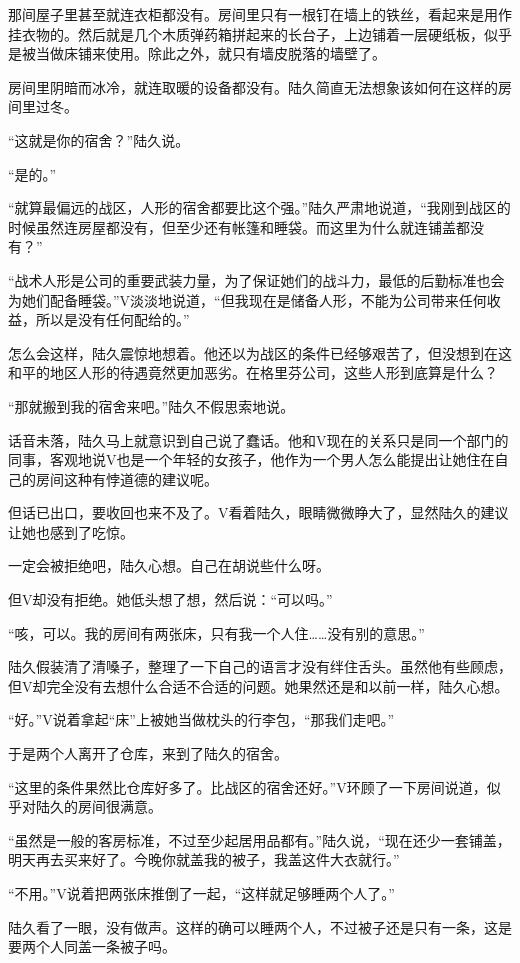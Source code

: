 那间屋子里甚至就连衣柜都没有。房间里只有一根钉在墙上的铁丝，看起来是用作挂衣物的。然后就是几个木质弹药箱拼起来的长台子，上边铺着一层硬纸板，似乎是被当做床铺来使用。除此之外，就只有墙皮脱落的墙壁了。

房间里阴暗而冰冷，就连取暖的设备都没有。陆久简直无法想象该如何在这样的房间里过冬。

“这就是你的宿舍？”陆久说。

“是的。”

“就算最偏远的战区，人形的宿舍都要比这个强。”陆久严肃地说道，“我刚到战区的时候虽然连房屋都没有，但至少还有帐篷和睡袋。而这里为什么就连铺盖都没有？”

“战术人形是公司的重要武装力量，为了保证她们的战斗力，最低的后勤标准也会为她们配备睡袋。”V淡淡地说道，“但我现在是储备人形，不能为公司带来任何收益，所以是没有任何配给的。”

怎么会这样，陆久震惊地想着。他还以为战区的条件已经够艰苦了，但没想到在这和平的地区人形的待遇竟然更加恶劣。在格里芬公司，这些人形到底算是什么？

“那就搬到我的宿舍来吧。”陆久不假思索地说。

话音未落，陆久马上就意识到自己说了蠢话。他和V现在的关系只是同一个部门的同事，客观地说V也是一个年轻的女孩子，他作为一个男人怎么能提出让她住在自己的房间这种有悖道德的建议呢。

但话已出口，要收回也来不及了。V看着陆久，眼睛微微睁大了，显然陆久的建议让她也感到了吃惊。

一定会被拒绝吧，陆久心想。自己在胡说些什么呀。

但V却没有拒绝。她低头想了想，然后说：“可以吗。”

“咳，可以。我的房间有两张床，只有我一个人住……没有别的意思。”

陆久假装清了清嗓子，整理了一下自己的语言才没有绊住舌头。虽然他有些顾虑，但V却完全没有去想什么合适不合适的问题。她果然还是和以前一样，陆久心想。

“好。”V说着拿起“床”上被她当做枕头的行李包，“那我们走吧。”

于是两个人离开了仓库，来到了陆久的宿舍。

“这里的条件果然比仓库好多了。比战区的宿舍还好。”V环顾了一下房间说道，似乎对陆久的房间很满意。

“虽然是一般的客房标准，不过至少起居用品都有。”陆久说，“现在还少一套铺盖，明天再去买来好了。今晚你就盖我的被子，我盖这件大衣就行。”

“不用。”V说着把两张床推倒了一起，“这样就足够睡两个人了。”

陆久看了一眼，没有做声。这样的确可以睡两个人，不过被子还是只有一条，这是要两个人同盖一条被子吗。

